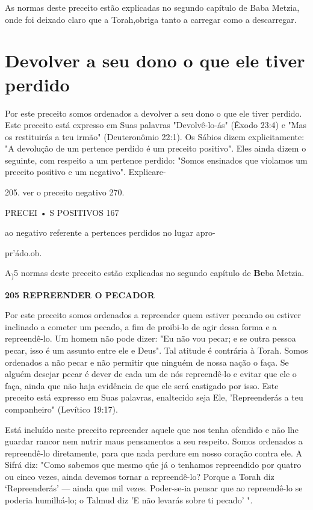 \begin{itemize}
\begin{enumrate}
\begin{itemize}
\begin{itemize}
\begin{itemize}
As normas deste preceito estão explicadas no segundo capítulo de Baba
Metzia, onde foi deixado claro que a Torah,obriga tanto a carregar como
a descarregar.

\section{Devolver a seu dono o que ele tiver perdido}

Por este preceito somos ordenados a devolver a seu dono o que ele tiver
perdido. Este preceito está expresso em Suas palavras "Devolvê-lo-ás"
(Êxo­do 23:4) e "Mas os restituirás a teu irmão" (Deuteronômio 22:1). Os
Sábios di­zem explicitamente: "A devolução de um pertence perdido é um
preceito po­sitivo". Eles ainda dizem o seguinte, com respeito a um
pertence perdido: "So­mos ensinados que violamos um preceito positivo e
um negativo". Explicare-

205. ver o preceito negativo 270.

PRECEI • S POSITIVOS 167


ao negativo referente a pertences perdidos no lugar apro-


pr'ádo.ob.

A\textsubscript{)}5 normas deste preceito estão explicadas no segundo
capítulo de \textbf{Be}ba Metzia.

\textbf{205 REPREENDER O PECADOR}

Por este preceito somos ordenados a repreender quem estiver pe­cando ou
estiver inclinado a cometer um pecado, a fim de proibi-lo de agir des­sa
forma e a repreendê-lo. Um homem não pode dizer: "Eu não vou pecar; e se
outra pessoa pecar, isso é um assunto entre ele e Deus". Tal atitude é
contrá­ria à Torah. Somos ordenados a não pecar e não permitir que
ninguém de nos­sa nação o faça. Se alguém desejar pecar é dever de cada
um de nós repreendê-lo e evitar que ele o faça, ainda que não haja
evidência de que ele será castigado por isso. Este preceito está
expresso em Suas palavras, enaltecido seja Ele, 'Re­preenderás a teu
companheiro" (Levítico 19:17).

Está incluído neste preceito repreender aquele que nos tenha ofen­dido e
não lhe guardar rancor nem nutrir maus pensamentos a seu respeito. Somos
ordenados a repreendê-lo diretamente, para que nada perdure em nos­so
coração contra ele. A Sifrá diz: "Como sabemos que mesmo qúe já o
tenha­mos repreendido por quatro ou cinco vezes, ainda devemos tornar a
repreendê-lo? Porque a Torah diz `Repreenderás' --- ainda que mil vezes.
Poder-se-ia pen­sar que ao repreendê-lo se poderia humilhá-lo; o Talmud
diz 'E não levarás so­bre ti pecado' ".


\end{itemize}
\end{itemize}
\end{itemize}
\end{enumrate}
\end{itemize}
